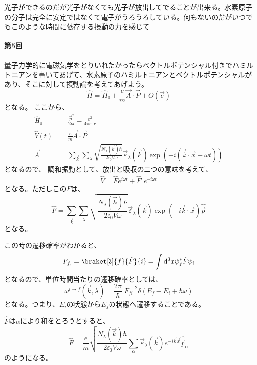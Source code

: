 \documentclass[titlepage]{ltjsarticle}
\newcommand{\mel}[3]{\braket[3]{#1}{#2}{#3}}
\begin{document}
光子ができるのだが光子がなくても光子が放出してでることが出来る。水素原子の分子は完全に安定ではなくて電子がうろうろしている。何もないのだがいつでもこのような時間に依存する摂動の力を感じて



\paragraph{第5回}
量子力学的に電磁気学をとりいれたかったらベクトルポテンシャル付きでハミルトニアンを書いてあげて、水素原子のハミルトニアンとベクトルポテンシャルがあり、そこに対して摂動論を考えてあげよう。
\begin{equation}
  \hat{H} = \hat{H}_0 + \frac{e}{m} \vec{A} \cdot \vec{P} + O(\vec{e})
\end{equation}
となる。
ここから、
\begin{align}
  \hat{H}_0 & = \frac{\vec{p}^2}{2m} - \frac{e^2}{4\pi \varepsilon_0 r} \\
  \hat{V}(t) & = \frac{e}{m} \vec{A}\cdot \vec{P}\\
  \vec{A} &= \sum_{\vec{k}}\sum_{\lambda}\sqrt{\frac{N_{\lambda}(\vec{k})\hbar}{2 \varepsilon_0 V \omega}}\vec{\varepsilon}_\lambda(\vec{k})\exp\left( -i \left( \vec{k}\cdot \vec{x}- \omega t \right) \right)
\end{align}
となるので、
調和振動として、放出と吸収の二つの意味を考えて、
\begin{equation}
  \hat{V}  = \hat{F}e^{i\omega t} + \hat{F}^\dagger e^{-i\omega t}
\end{equation}
となる。ただしこの\(F\)は、
\begin{equation}
  \hat{F} = \sum_{\vec{k}}\sum_{\lambda}\sqrt{\frac{N_{\lambda}(\vec{k})\hbar}{2 \varepsilon_0 V \omega}}\vec{\varepsilon}_\lambda(\vec{k})\exp\left( - i \vec{k}\cdot \vec{x} \right) \hat{\vec{p}}
\end{equation}
となる。

この時の遷移確率がわかると、
\begin{equation}
  F_{f_i} = \mel{f}{\hat{F}}{i} = \int \odif[order=3]{x } \psi^*_{f} \hat{F} \psi_i
\end{equation}
となるので、単位時間当たりの遷移確率としては、
\begin{equation}
  \omega^{i\to f}(\vec{k},\lambda) = \frac{2\pi}{\hbar} |F_{fi}|^2 \delta(E_f - E_i + \hbar \omega)
\end{equation}
となる。つまり、\(E_i\)の状態から\(E_f\)の状態へ遷移することである。

\(\hat{F}\)は\(\alpha\)により和をとろうとすると、
\begin{equation}
  \hat{F} = \frac{e }{m} \sqrt{\frac{N_\lambda(\vec{k})\hbar}{2\varepsilon_0 V \omega}}\sum_\alpha \vec{\varepsilon}_\lambda(\vec{k})e^{-i \vec{k}\vec{x}}\hat{\vec{p}}_\alpha
\end{equation}
のようになる。
\end{document}
